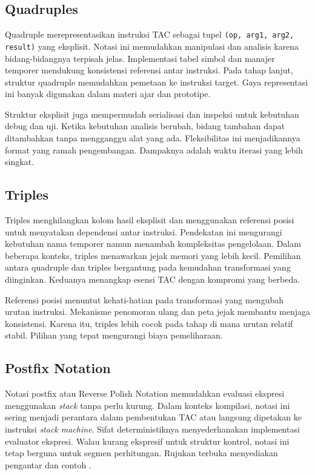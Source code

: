 \documentclass[../main.tex]{subfiles}
\begin{document}
\subsection{Quadruples}
Quadruple merepresentasikan instruksi TAC sebagai tupel \texttt{(op, arg1, arg2, result)} yang eksplisit. Notasi ini memudahkan manipulasi dan analisis karena bidang-bidangnya terpisah jelas. Implementasi tabel simbol dan manajer temporer mendukung konsistensi referensi antar instruksi. Pada tahap lanjut, struktur quadruple memudahkan pemetaan ke instruksi target. Gaya representasi ini banyak digunakan dalam materi ajar dan prototipe.

Struktur eksplisit juga mempermudah serialisasi dan inspeksi untuk kebutuhan debug dan uji. Ketika kebutuhan analisis berubah, bidang tambahan dapat ditambahkan tanpa mengganggu alat yang ada. Fleksibilitas ini menjadikannya format yang ramah pengembangan. Dampaknya adalah waktu iterasi yang lebih singkat.

\subsection{Triples}
Triples menghilangkan kolom hasil eksplisit dan menggunakan referensi posisi untuk menyatakan dependensi antar instruksi. Pendekatan ini mengurangi kebutuhan nama temporer namun menambah kompleksitas pengelolaan. Dalam beberapa konteks, triples menawarkan jejak memori yang lebih kecil. Pemilihan antara quadruple dan triples bergantung pada kemudahan transformasi yang diinginkan. Keduanya menangkap esensi TAC dengan kompromi yang berbeda.

Referensi posisi menuntut kehati-hatian pada transformasi yang mengubah urutan instruksi. Mekanisme penomoran ulang dan peta jejak membantu menjaga konsistensi. Karena itu, triples lebih cocok pada tahap di mana urutan relatif stabil. Pilihan yang tepat mengurangi biaya pemeliharaan.

\subsection{Postfix Notation}
Notasi postfix atau Reverse Polish Notation memudahkan evaluasi ekspresi menggunakan \emph{stack} tanpa perlu kurung. Dalam konteks kompilasi, notasi ini sering menjadi perantara dalam pembentukan TAC atau langsung dipetakan ke instruksi \emph{stack machine}. Sifat deterministiknya menyederhanakan implementasi evaluator ekspresi. Walau kurang ekspresif untuk struktur kontrol, notasi ini tetap berguna untuk segmen perhitungan. Rujukan terbuka menyediakan pengantar dan contoh \citep{WikiPostfix}.
\end{document}
